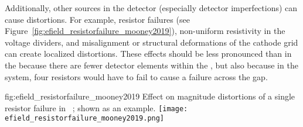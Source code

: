 Additionally, other sources in the detector (especially detector imperfections) can cause \efield distortions. For example,  resistor failures (see Figure~\ref{fig:efield_resistorfailure_mooney2019}), non-uniform resistivity in the voltage dividers, and misalignment or structural deformations of the cathode grid can create localized \efield distortions. These effects should be less pronounced than in the  because there are fewer detector elements within the , but also because in the  system, four resistors would have to fail to cause a failure across the  gap.


\begin{dunefigure}{fig:efield_resistorfailure_mooney2019}
{Effect on \efield magnitude distortions of a single  resistor failure in ~\cite{bib:mooney2019a}; shown as an example. 
}
\texttt{[image: efield\_resistorfailure\_mooney2019.png]}
\end{dunefigure}


